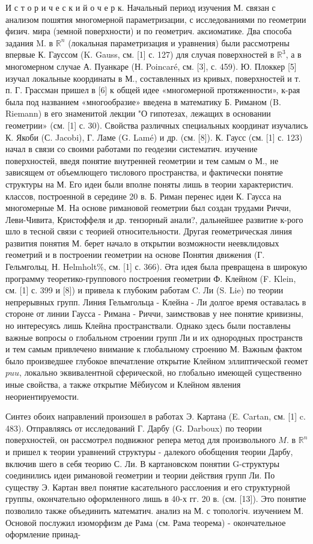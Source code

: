 \documentclass[10pt]{article}
\begin{document}
И с т о р и ч е с к и й о ч е р к. Начальный период изучения М. связан с анализом пошятия многомерной параметризации, с исследованиями по геометрии физич. мира (земной поверхности) и по геометрич. аксиоматике. Два способа задания M. в $\mathbb{R}^{n}$ (локальная параметризация и уравнения) были рассмотрены впервые К. Гауссом (K. Gauss, см. [1] с. 127) для случая поверхностей в $\mathbb{R}^{3}$, а в многомерном случае А. Пуанкаре (Н. Poincaré, см. [3], с. 459). Ю. Плоккер [5] изучал локальные координаты в М., составленных из кривых, поверхностей и т. п. Г. Грассман пришел в [6] к общей идее «многомерной протяженности», к-рая была под названием «многообразие» введена в математику Б. Риманом (B. Riemann) в его знаменитой лекции "О гипотезах, лежащих в основании геометрии» (см. [1] с. 30). Свойства различных специальных координат изучались К. Якоби (С. Jacobi), Г. Ламе (G. Lamé) и др. (см. [8]). К. Гаусс (см. [1] с. 123) начал в связи со своими работами по геодезии систематич. изучение поверхностей, введя понятие внутренней геометрии и тем самым о М., не зависящем от объемлющего тислового пространства, и фактически понятие структуры на М. Его идеи были вполне поняты лишь в теории характеристич. классов, построенной в середине 20 в. Б. Риман перенес идеи К. Гаусса на многомерные М. На основе римановой геометрии был создан трудами Риччи, Леви-Чивита, Кристоффеля и др. тензорный анали?, дальнейшее развитие к-рого шло в тесной связи с теорией относительности. Другая геометрическая линия развития понятия М. берет начало в открытии возможности неевклидовых геометрий и в построении геометрии на основе Понятия движения (Г. Гельмгольц, Н. Helmholt\%, см. [1] с. 366). Әта идея была превращена в широкую программу теоретико-группового построения геометрии Ф. Клейном (F. Klein, см. [1] с. 399 и [8]) и привела к глубоким работам C. Ли (S. Lie) по теории непрерывных групп. Линия Гельмгольца - Клейна - Ли долгое время оставалась в стороне от линии Гаусса - Римана - Риччи, заимствовав у нее понятие кривизны, но интересуясь лишь Клейна пространствали. Однако здесь были поставлены важные вопросы о глобальном строении групп Ли и их однородных пространств и тем самым привлечено внимание к глобальному строению М. Важным фактом было произведшее глубокое впечатление открытие Клейном эллиптической геомет$p u u$, локально эквивалентной сферической, но глобально имеющей существенно иные свойства, а также открытие Мёбиусом и Клейном явления неориентируемости.



Синтез обоих направлений произошел в работах Э. Картана (E. Cartan, см. [1] c. 483). Отправляясь от исследований Г. Дарбу (G. Darboux) по теории поверхностей, он рассмотрел подвижног репера метод для произвольного $M$. в $\mathbb{R}^{n}$ и пришел к теории уравнений структуры - далекого обобщения теории Дарбу, включив шего в себя теорию С. Ли. В картановском понятии G-структуры соединились идеи римановой геометрии и теории действия групп Ли. По существу Э. Картан ввел понятие касательного расслоения и его структурной группы, окончательно оформленного лишь в 40-х гг. 20 в. (см. [13]). Это понятие позволило также объединить математич. анализ на М. с топологіч. изучением М. Основой послужил изоморфизм де Рама (см. Рама теорема) - окончательное оформление принад-
\end{document}
